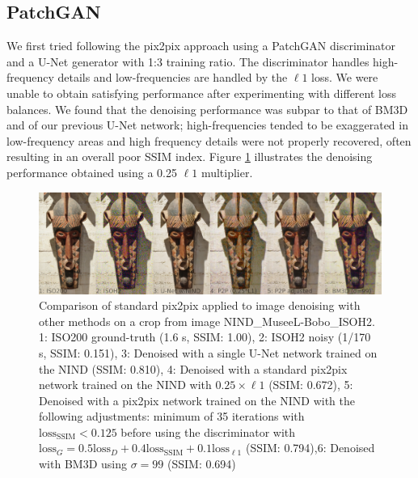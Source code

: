 \subsection{PatchGAN}

We first tried following the pix2pix approach using a PatchGAN discriminator and a U-Net generator \cite{pix2pix} with 1:3 training ratio. The discriminator handles high-frequency details and low-frequencies are handled by the $\ell 1$ loss. We were unable to obtain satisfying performance after experimenting with different loss balances. We found that the denoising performance was subpar to that of \ac{BM3D} and of our previous U-Net network; high-frequencies tended to be exaggerated in low-frequency areas and high frequency details were not properly recovered, often resulting in an overall poor \ac{SSIM} index. Figure \ref{fig:p2p-def} illustrates the denoising performance obtained using a 0.25 $\ell 1$ multiplier.

\begin{figure}[!htbp]
  \begin{center}
    \includegraphics[width=1\linewidth]{gfx/comp/p2p_def.jpg}
    \caption[Initial (c)GAN denoising (visual comparison)]{Comparison of standard pix2pix \cite{pix2pix} applied to image denoising with other methods on a crop from image NIND\_MuseeL-Bobo\_ISOH2. 1: ISO200 ground-truth (1.6 s, SSIM: 1.00), 2: ISOH2 noisy (1/170 s, SSIM: 0.151), 3: Denoised with a single U-Net network trained on the \ac{NIND} (SSIM: 0.810), 4: Denoised with a standard pix2pix network trained on the \ac{NIND} with $0.25\times\ell 1$ (SSIM: 0.672), 5: Denoised with a pix2pix network trained on the \ac{NIND} with the following adjustments: minimum of 35 iterations with $\text{loss}_\text{SSIM} < 0.125$ before using the discriminator with $\text{loss}_G=0.5 \text{loss}_D + 0.4 \text{loss}_\text{SSIM} + 0.1 \text{loss}_{\ell 1}$ (SSIM: 0.794),6: Denoised with \ac{BM3D} using $\sigma=99$ (SSIM: 0.694)}
    \label{fig:p2p-def}
  \end{center}
\end{figure}

